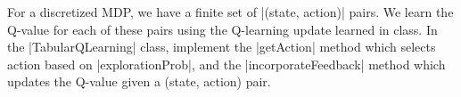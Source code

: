 \item {}

For a discretized MDP, we have a finite set of |(state, action)| pairs. We learn the Q-value for each of these pairs using 
the Q-learning update learned in class. In the |TabularQLearning| class, implement the |getAction| method which selects 
action based on |explorationProb|, and the |incorporateFeedback| method which updates the Q-value given a (state, action) pair. 